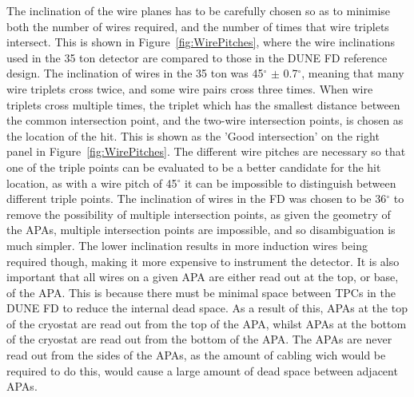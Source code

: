 The inclination of the wire planes has to be carefully chosen so as to minimise both the number of wires required, and the number of times that wire triplets intersect. This is shown in Figure~\ref{fig:WirePitches}, where the wire inclinations used in the 35 ton detector are compared to those in the DUNE FD reference design. The inclination of wires in the 35 ton was 45$^{\circ}$ $\pm$ 0.7$^{\circ}$, meaning that many wire triplets cross twice, and some wire pairs cross three times. When wire triplets cross multiple times, the triplet which has the smallest distance between the common intersection point, and the two-wire intersection points, is chosen as the location of the hit. This is shown as the 'Good intersection' on the right panel in Figure~\ref{fig:WirePitches}. The different wire pitches are necessary so that one of the triple points can be evaluated to be a better candidate for the hit location, as with a wire pitch of 45$^{\circ}$ it can be impossible to distinguish between different triple points. The inclination of wires in the FD was chosen to be 36$^{\circ}$ to remove the possibility of multiple intersection points, as given the geometry of the APAs, multiple intersection points are impossible, and so disambiguation is much simpler. The lower inclination results in more induction wires being required though, making it more expensive to instrument the detector. It is also important that all wires on a given APA are either read out at the top, or base, of the APA. This is because there must be minimal space between TPCs in the DUNE FD to reduce the internal dead space. As a result of this, APAs at the top of the cryostat are read out from the top of the APA, whilst APAs at the bottom of the cryostat are read out from the bottom of the APA. The APAs are never read out from the sides of the APAs, as the amount of cabling wich would be required to do this, would cause a large amount of dead space between adjacent APAs. \\

